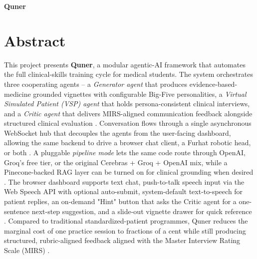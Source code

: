 \documentclass{article}
\begin{document}
\newpage

\tableofcontents
\thispagestyle{empty}
\cleardoublepage
\typeout{}


\begin{center}
    \huge \textbf{Quner}
\end{center}

\section{Abstract}
This project presents \textbf{Quner}, a modular agentic-AI framework that automates the full clinical-skills training cycle for medical students. The system orchestrates three cooperating agents -- a \emph{Generator agent} that produces evidence-based-medicine grounded vignettes with configurable Big-Five personalities, a \emph{Virtual Simulated Patient (VSP) agent} that holds persona-consistent clinical interviews, and a \emph{Critic agent} that delivers MIRS-aligned communication feedback alongside structured clinical evaluation \cite{Kulkarni2023TheEO,Topsakal2023CreatingLL}. Conversation flows through a single asynchronous WebSocket hub that decouples the agents from the user-facing dashboard, allowing the same backend to drive a browser chat client, a Furhat robotic head, or both \cite{Plale2013BigDO}. A pluggable \emph{pipeline mode} lets the same code route through OpenAI, Groq's free tier, or the original Cerebras + Groq + OpenAI mix, while a Pinecone-backed RAG layer can be turned on for clinical grounding when desired \cite{Monir2024VectorSearchED}. The browser dashboard supports text chat, push-to-talk speech input via the Web Speech API with optional auto-submit, system-default text-to-speech for patient replies, an on-demand "Hint" button that asks the Critic agent for a one-sentence next-step suggestion, and a slide-out vignette drawer for quick reference \cite{Zhang2023SentimentAI}. Compared to traditional standardized-patient programmes, Quner reduces the marginal cost of one practice session to fractions of a cent while still producing structured, rubric-aligned feedback aligned with the Master Interview Rating Scale (MIRS) \cite{Jing2024WhenLL}.
\end{document}
